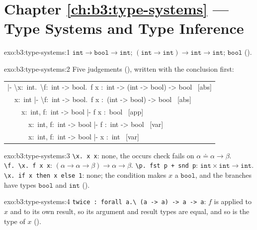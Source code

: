 \section*{Chapter \ref{ch:b3:type-systems} --- Type Systems and Type Inference}

\begin{solution}{exo:b3:type-systems:1}
$\mathtt{int} \to \mathtt{bool} \to \mathtt{int}$; $(\mathtt{int} \to \mathtt{int}) \to \mathtt{int} \to \mathtt{int}$; $\mathtt{bool}$ ().
\end{solution}

\begin{solution}{exo:b3:type-systems:2}
Five judgements (), written with the conclusion first:
\begin{center}\small\ttfamily\frenchspacing\begin{tabular}{l}
|- \textbackslash{}x:\ int.\ \textbackslash{}f:\ int -> bool.\ f x :\ int -> (int -> bool) -> bool \ [abs]\\
\ \ x:\ int |- \textbackslash{}f:\ int -> bool.\ f x :\ (int -> bool) -> bool \ [abs]\\
\ \ \ \ x:\ int, f:\ int -> bool |- f x :\ bool \ [app]\\
\ \ \ \ \ \ x:\ int, f:\ int -> bool |- f :\ int -> bool \ [var]\\
\ \ \ \ \ \ x:\ int, f:\ int -> bool |- x :\ int \ [var]
\end{tabular}\end{center}
\end{solution}

\begin{solution}{exo:b3:type-systems:3}
\texttt{\textbackslash{}x.\ x x}: none, the occurs check fails on $\alpha \doteq \alpha \to \beta$. \texttt{\textbackslash{}f.\ \textbackslash{}x.\ f x x}: $(\alpha \to \alpha \to \beta) \to \alpha \to \beta$. \texttt{\textbackslash{}p.\ fst p + snd p}: $\mathtt{int} \times \mathtt{int} \to \mathtt{int}$. \texttt{\textbackslash{}x.\ if x then x else 1}: none; the condition makes $x$ a $\mathtt{bool}$, and the branches have types $\mathtt{bool}$ and $\mathtt{int}$ ().
\end{solution}

\begin{solution}{exo:b3:type-systems:4}
\texttt{twice    :\ forall \textquotesingle{}a.\textbackslash{} (\textquotesingle{}a -> \textquotesingle{}a) -> \textquotesingle{}a -> \textquotesingle{}a}: $f$ is applied to $x$ and to its own result, so its argument and result types are equal, and so is the type of $x$ ().
\end{solution}

